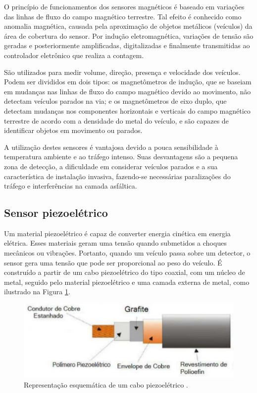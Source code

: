 O princípio de funcionamentos dos sensores magnéticos é baseado em variações das linhas de fluxo do campo magnético terrestre. Tal efeito é conhecido como anomalia magnética, causada pela aproximação de objetos metálicos (veículos) da área de cobertura do sensor. Por indução eletromagnética, variações de tensão são geradas e posteriormente amplificadas, digitalizadas e finalmente transmitidas ao controlador eletrônico que realiza a contagem.

São utilizados para medir volume, direção, presença e velocidade dos veículos. Podem ser divididos em dois tipos: os magnetômetros de indução, que se baseiam em mudanças nas linhas de fluxo do campo magnético devido ao movimento, não detectam veículos parados na via; e os magnetômetros de eixo duplo, que detectam mudanças nos componentes horizontais e verticais do campo magnético terrestre de acordo com a densidade do metal do veículo, e são capazes de identificar objetos em movimento ou parados.

 A utilização destes sensores é vantajosa devido a pouca sensibilidade à temperatura ambiente e ao tráfego intenso. Suas desvantagens são a pequena zona de detecção, a dificuldade em considerar veículos parados e a sua característica de instalação invasiva, fazendo-se necessárias paralizações do tráfego e interferências na camada asfáltica.


\subsection{Sensor piezoelétrico} %
\label{sub:sensores_piezoel_tricos}

Um material piezoelétrico é capaz de converter energia cinética em energia elétrica. Esses materiais geram uma tensão quando submetidos a choques mecânicos ou vibrações. Portanto, quando um veículo passa sobre um detector, o sensor gera uma tensão que pode ser proporcional ao peso do veículo. É construído a partir de um cabo piezoelétrico do tipo coaxial, com um núcleo de metal, seguido pelo material piezoelétrico e uma camada externa de metal, como ilustrado na Figura \ref{fig:piezoeletrico}.

\begin{figure}[ht]
  \begin{center}
    \includegraphics[scale=0.6]{imgs/piezoeletrico.png}
  \end{center}
  \caption{Representação esquemática de um cabo piezoelétrico \citep{goldner:2009:misc}.}
  \label{fig:piezoeletrico}
\end{figure}

